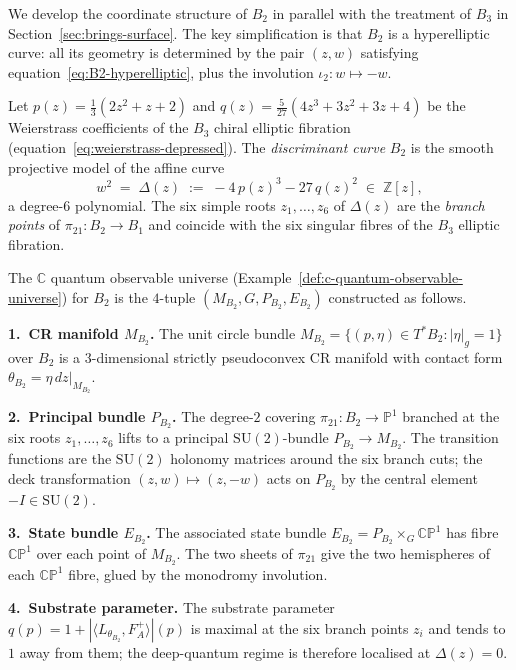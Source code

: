 We develop the coordinate structure of $B_2$ in parallel with the
treatment of $B_3$ in Section~\ref{sec:brings-surface}.  The key
simplification is that $B_2$ is a hyperelliptic curve: all its
geometry is determined by the pair $(z, w)$ satisfying
equation~\eqref{eq:B2-hyperelliptic}, plus the involution
$\iota_2\colon w \mapsto -w$.

\begin{definition}
\label{def:B2-discriminant-cover}
Let $p(z) = \tfrac{1}{3}(2z^2+z+2)$ and
$q(z) = \tfrac{5}{27}(4z^3+3z^2+3z+4)$ be the
Weierstrass coefficients of the $B_3$ chiral elliptic fibration
(equation~\eqref{eq:weierstrass-depressed}).  The
\emph{discriminant curve} $B_2$ is the smooth projective model of the
affine curve
\begin{equation}\label{eq:B2-affine}
  w^2 \;=\; \Delta(z)
  \;:=\; -4\,p(z)^3 - 27\,q(z)^2
  \;\in\; \mathbb{Z}[z],
\end{equation}
a degree-$6$ polynomial.  The six simple roots $z_1,\dots,z_6$
of $\Delta(z)$ are the \emph{branch points} of $\pi_{21}\colon B_2\to B_1$
and coincide with the six singular fibres of the $B_3$ elliptic
fibration.
\end{definition}

\begin{remark}
\label{rem:B2-qou-tuple}
The $\mathbb{C}$ quantum observable universe
(Example~\ref{def:c-quantum-observable-universe}) for $B_2$
is the $4$-tuple $(M_{B_2}, G, P_{B_2}, E_{B_2})$ constructed as follows.

\medskip
\noindent\textbf{1.~CR manifold $M_{B_2}$.}\;
The unit circle bundle $M_{B_2} = \{(p,\eta)\in T^*B_2 : |\eta|_{g}=1\}$
over $B_2$ is a $3$-dimensional strictly pseudoconvex CR manifold
with contact form $\theta_{B_2} = \eta\,dz|_{M_{B_2}}$.

\medskip
\noindent\textbf{2.~Principal bundle $P_{B_2}$.}\;
The degree-$2$ covering $\pi_{21}\colon B_2\to\mathbb{P}^1$ branched
at the six roots $z_1,\dots,z_6$ lifts to a principal
$\mathrm{SU}(2)$-bundle $P_{B_2}\to M_{B_2}$.  The transition functions
are the $\mathrm{SU}(2)$ holonomy matrices around the six branch cuts;
the deck transformation $(z,w)\mapsto(z,-w)$ acts on $P_{B_2}$ by the
central element $-I\in\mathrm{SU}(2)$.

\medskip
\noindent\textbf{3.~State bundle $E_{B_2}$.}\;
The associated state bundle $E_{B_2} = P_{B_2}\times_G\mathbb{CP}^1$
has fibre $\mathbb{CP}^1$ over each point of $M_{B_2}$.  The two sheets
of $\pi_{21}$ give the two hemispheres of each $\mathbb{CP}^1$ fibre,
glued by the monodromy involution.

\medskip
\noindent\textbf{4.~Substrate parameter.}\;
The substrate parameter
$q(p) = 1 + |\langle L_{\theta_{B_2}}, F_{A}^+\rangle|(p)$
is maximal at the six branch points $z_i$ and tends to $1$ away from
them; the deep-quantum regime is therefore localised at
$\Delta(z)=0$.
\end{remark}

